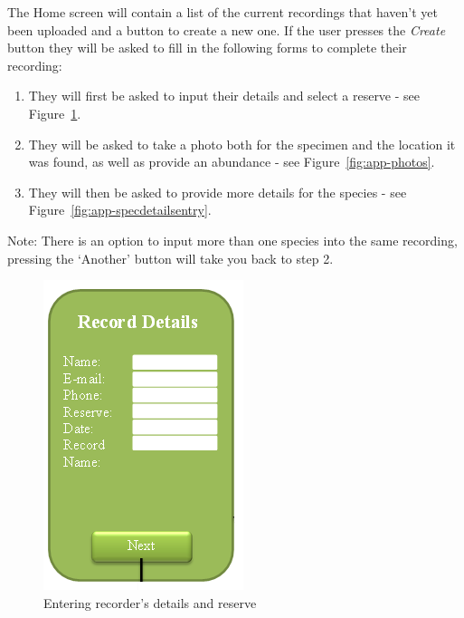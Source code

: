 \documentclass[12pt]{article}
\begin{document}
		The Home screen will contain a list of the current recordings that haven't yet been uploaded and a button to create a new one. 
		If the user presses the \textit{Create} button they will be asked to fill in the following forms to complete their recording:
		\begin{enumerate}
			\item They will first be asked to input their details and select a reserve - see Figure~\ref{fig:app-recdetails}.
			\item They will be asked to take a photo both for the specimen and the location it was found, as well as provide an abundance - see Figure~\ref{fig:app-photos}.
			\item They will then be asked to provide more details for the species - see Figure~\ref{fig:app-specdetailsentry}.
		\end{enumerate}
		Note: There is an option to input more than one species into the same recording, pressing the `Another' button will take you back to step 2.

		\begin{figure}[H]
			\begin{center}
				\includegraphics[scale=0.7]{app-RecorderDetails}
			\end{center}
			\caption{Entering recorder's details and reserve}
			\label{fig:app-recdetails}
		\end{figure}
\end{document}
